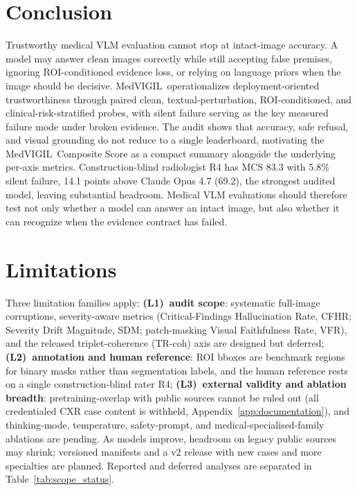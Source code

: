 \documentclass{article}
\newcommand{\medvigil}{MedVIGIL}
\begin{document}
\section{Conclusion}
\label{sec:conclusion}

Trustworthy medical VLM evaluation cannot stop at intact-image accuracy. A model may answer clean images correctly while still accepting false premises, ignoring ROI-conditioned evidence loss, or relying on language priors when the image should be decisive. \medvigil\ operationalizes deployment-oriented trustworthiness through paired clean, textual-perturbation, ROI-conditioned, and clinical-risk-stratified probes, with silent failure serving as the key measured failure mode under broken evidence. The audit shows that accuracy, safe refusal, and visual grounding do not reduce to a single leaderboard, motivating the \medvigil\ Composite Score as a compact summary alongside the underlying per-axis metrics. Construction-blind radiologist \textsc{R4} has MCS 83.3 with 5.8\% silent failure, 14.1 points above Claude Opus 4.7 (69.2), the strongest audited model, leaving substantial headroom. Medical VLM evaluations should therefore test not only whether a model can answer an intact image, but also whether it can recognize when the evidence contract has failed.

\section{Limitations}
\label{sec:limitations}

Three limitation families apply: \textbf{(L1)~audit scope}: systematic full-image corruptions, severity-aware metrics (Critical-Findings Hallucination Rate, CFHR; Severity Drift Magnitude, SDM; patch-masking Visual Faithfulness Rate, VFR), and the released triplet-coherence (TR-coh) axis are designed but deferred; \textbf{(L2)~annotation and human reference}: ROI bboxes are benchmark regions for binary masks rather than segmentation labels, and the human reference rests on a single construction-blind rater \textsc{R4}; \textbf{(L3)~external validity and ablation breadth}: pretraining-overlap with public sources cannot be ruled out (all credentialed CXR case content is withheld, Appendix~\ref{app:documentation}), and thinking-mode, temperature, safety-prompt, and medical-specialised-family ablations are pending. As models improve, headroom on legacy public sources may shrink; versioned manifests and a v2 release with new cases and more specialties are planned. Reported and deferred analyses are separated in Table~\ref{tab:scope_status}.
\end{document}
